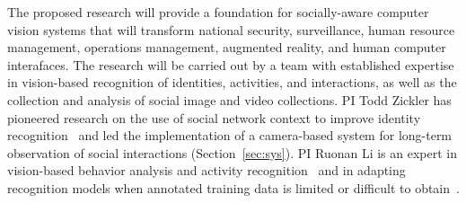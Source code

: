 The proposed research will provide a foundation for socially-aware computer vision systems that will transform national security, surveillance, human resource management, operations management, augmented reality, and human computer interafaces. The research will be carried out by a team with established expertise in vision-based recognition of identities, activities, and interactions, as well as the collection and analysis of social image and video collections. PI Todd Zickler has pioneered research on the use of social network context to improve identity recognition~\cite{Stone2008,Stone2010} and led the implementation of a camera-based system for long-term observation of social interactions (Section~\ref{sec:sys}). PI Ruonan Li is an expert in vision-based behavior analysis and activity recognition~\cite{groupdet2013,LiIJCV2012,LiPAMI2012,Li2010} and in adapting recognition models when annotated training data is limited or difficult to obtain~\cite{LiZickler2012,Li2011}. 





